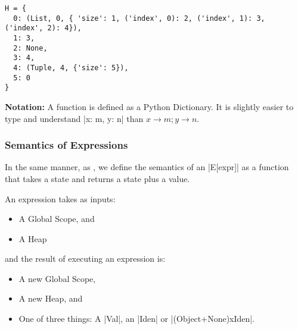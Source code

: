 \begin{verbatim}
H = {
  0: (List, 0, { 'size': 1, ('index', 0): 2, ('index', 1): 3, ('index', 2): 4}),
  1: 3,
  2: None,
  3: 4,
  4: (Tuple, 4, {'size': 5}),
  5: 0
}
\end{verbatim}

\textbf{Notation:} A function is defined as a Python Dictionary. It is
slightly easier to type and understand \pycode|{x: m, y: n}| than
\(x \rightarrow m; y \rightarrow n\).

\subsubsection*{Semantics of Expressions}

In the same manner, as \textcite{fromherz_static_2018}, we define the
semantics of an \pycode|E[expr]| as a function that
takes a state and returns a state plus a value.

An expression takes as inputs:

\begin{itemize}
\tightlist
\item A Global Scope, and
\item A Heap
\end{itemize}

and the result of executing an expression is:

\begin{itemize}
\tightlist
\item A new Global Scope,
\item A new Heap, and
\item One of three things: A \pycode|Val|, an \pycode|Iden| or
  \pycode|(Object+None)xIden|.
\end{itemize}


